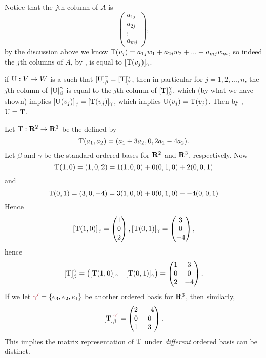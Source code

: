 \begin{remark} \label{remark 2.2.2}
Notice that the \(j\)th column of \(A\) is
\[
    \begin{pmatrix} a_{1j} \\ a_{2j} \\ \vdots \\ a_{mj} \end{pmatrix},
\]
by the discussion above we know \(\mathrm{T}(v_j) = a_{1j} w_1 + a_{2j} w_2 + ... + a_{mj} w_m\),
so indeed the \(j\)th columns of \(A\), by , is equal to \([\mathrm{T}(v_j)]_{\gamma}\).

 if \(\mathrm{U}: V \to W\) is a \LTRAN{} such that \([\mathrm{U}]_{\beta}^{\gamma} = [\mathrm{T}]_{\beta}^{\gamma}\),
then in particular for \(j = 1, 2, ..., n\), the \(j\)th column of \([\mathrm{U}]_{\beta}^{\gamma}\) is equal to the \(j\)th column of \([\mathrm{T}]_{\beta}^{\gamma}\),
which (by what we have shown) implies \([\mathrm{U}(v_j)]_{\gamma} = [\mathrm{T}(v_j)]_{\gamma}\),
which implies \(\mathrm{U}(v_j) = \mathrm{T}(v_j)\).
Then by , \(\mathrm{U} = \mathrm{T}\).
\end{remark}

\begin{example} \label{example 2.2.3}
Let \(\mathrm{T} : \mathbf{R}^2 \to \mathbf{R}^3\) be the \LTRAN{} defined by
\[
    \mathrm{T}(a_1, a_2) = (a_1 + 3a_2, 0, 2a_1 - 4a_2).
\]
Let \(\beta\) and \(\gamma\) be the standard ordered bases for \(\mathbf{R}^2\) and \(\mathbf{R}^3\), respectively.
Now
\[
    \mathrm{T}(1, 0) = (1, 0, 2) = 1(1, 0, 0) + 0(0, 1, 0) + 2(0, 0, 1)
\]
and
\[
    \mathrm{T}(0, 1) = (3, 0, -4) = 3(1, 0, 0) + 0(0, 1, 0) + -4(0, 0, 1)
\]
Hence
\[
    [\mathrm{T}(1, 0)]_{\gamma} = \begin{pmatrix} 1 \\ 0 \\ 2 \end{pmatrix},
    [\mathrm{T}(0, 1)]_{\gamma} = \begin{pmatrix} 3 \\ 0 \\ -4 \end{pmatrix},
\]
hence
\[
    [\mathrm{T}]_{\beta}^{\gamma} = \begin{pmatrix} [\mathrm{T}(1, 0)]_{\gamma} & [\mathrm{T}(0, 1)]_{\gamma} \end{pmatrix}
    = \begin{pmatrix} 1 & 3 \\ 0 & 0 \\ 2 & -4 \end{pmatrix}.
\]
If we let \(\MAROON{\gamma'} = \{ e_3, e_2, e_1 \}\) be another ordered basis for \(\mathbf{R}^3\), then similarly,
\[
    [\T]_{\beta}^{\MAROON{\gamma'}} = \begin{pmatrix} 2 & -4 \\ 0 & 0 \\ 1 & 3 \end{pmatrix}.
\]
This implies the matrix representation of \(\mathrm{T}\) under \emph{different} ordered basis can be distinct.
\end{example}

